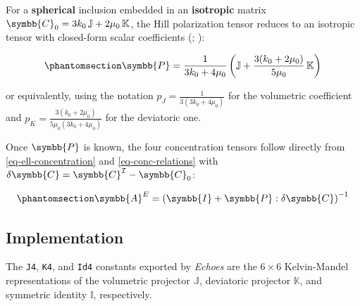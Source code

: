 \documentclass[
  a4paper,
  numbers=noendperiod,
  DIV=12]{scrreprt}
\newcommand{\uuuu}[1]{{\symbb{{#1}}}}
\begin{document}
For a \textbf{spherical} inclusion embedded in an \textbf{isotropic}
matrix \(\uuuu{C}_0 = 3k_0\,\mathbb{J}+2\mu_0\,\mathbb{K}\), the Hill
polarization tensor reduces to an isotropic tensor with closed-form
scalar coefficients (;
):

\begin{equation}\protect\phantomsection\label{eq-P-sphere-iso}{
\uuuu{P} = \frac{1}{3k_0+4\mu_0}
\left(\mathbb{J} + \frac{3(k_0+2\mu_0)}{5\mu_0}\,\mathbb{K}\right)
}\end{equation}

or equivalently, using the notation \(p_J = \frac{1}{3(3k_0+4\mu_0)}\)
for the volumetric coefficient and
\(p_K = \frac{3(k_0+2\mu_0)}{5\mu_0(3k_0+4\mu_0)}\) for the deviatoric
one.

Once \(\uuuu{P}\) is known, the four concentration tensors follow
directly from \ref{eq-ell-concentration} and \ref{eq-conc-relations}
with \(\delta\uuuu{C} = \uuuu{C}^\mathcal{I}-\uuuu{C}_0\):

\begin{equation}\protect\phantomsection\label{eq-Ae-user}{
\uuuu{A}^E = \left(\uuuu{I}+\uuuu{P}:\delta\uuuu{C}\right)^{-1}
}\end{equation}

\subsection{Implementation}\label{implementation-1}

The \texttt{J4}, \texttt{K4}, and \texttt{Id4} constants exported by
\emph{Echoes} are the \(6\times6\) Kelvin-Mandel representations of the
volumetric projector \(\mathbb{J}\), deviatoric projector
\(\mathbb{K}\), and symmetric identity \(\mathbb{I}\), respectively.
\end{document}
